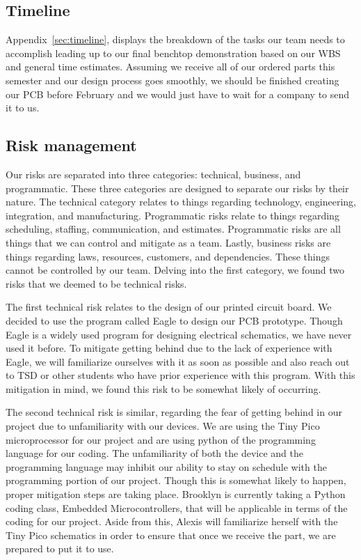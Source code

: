 \documentclass[twocolumn,10pt]{IEEEtran}
\begin{document}
\subsection{Timeline}
Appendix~\ref{sec:timeline},  displays the breakdown of the tasks our team needs to accomplish leading up to our final benchtop demonstration based on our WBS and general time estimates. Assuming we receive all of our ordered parts this semester and our design process goes smoothly, we should be finished creating our PCB before February and we would just have to wait for a company to send it to us.

\subsection{Risk management}
Our risks are separated into three categories: technical, business, and programmatic. These three categories are designed to separate our risks by their nature. The technical category relates to things regarding technology, engineering, integration, and manufacturing. Programmatic risks relate to things regarding scheduling, staffing, communication, and estimates. Programmatic risks are all things that we can control and mitigate as a team. Lastly, business risks are things regarding laws, resources, customers, and dependencies. These things cannot be controlled by our team. Delving into the first category, we found two risks that we deemed to be technical risks. 

The first technical risk relates to the design of our printed circuit board. We decided to use the program called Eagle to design our PCB prototype. Though Eagle is a widely used program for designing electrical schematics, we have never used it before. To mitigate getting behind due to the lack of experience with Eagle, we will familiarize ourselves with it as soon as possible and also reach out to TSD or other students who have prior experience with this program. With this mitigation in mind, we found this risk to be somewhat likely of occurring. 

The second technical risk is similar, regarding the fear of getting behind in our project due to unfamiliarity with our devices. We are using the Tiny Pico microprocessor for our project and are using python of the programming language for our coding. The unfamiliarity of both the device and the programming language may inhibit our ability to stay on schedule with the programming portion of our project. Though this is somewhat likely to happen, proper mitigation steps are taking place. Brooklyn is currently taking a Python coding class, Embedded Microcontrollers, that will be applicable in terms of the coding for our project. Aside from this, Alexis will familiarize herself with the Tiny Pico schematics in order to ensure that once we receive the part, we are prepared to put it to use. 
\end{document}
